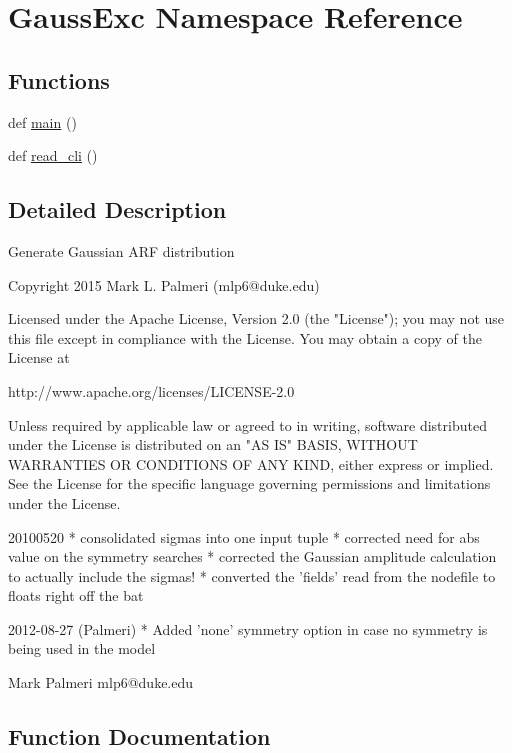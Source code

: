 \hypertarget{namespaceGaussExc}{}\section{Gauss\+Exc Namespace Reference}
\label{namespaceGaussExc}
\subsection*{Functions}
\begin{DoxyCompactItemize}
\item 
def \hyperlink{namespaceGaussExc_a0fa3008da0986251f5056832760afdc1}{main} ()
\item 
def \hyperlink{namespaceGaussExc_a405fba797ba4904016b95c6cf987bf55}{read\+\_\+cli} ()
\end{DoxyCompactItemize}


\subsection{Detailed Description}
\begin{DoxyVerb}Generate Gaussian ARF distribution

Copyright 2015 Mark L. Palmeri (mlp6@duke.edu)

Licensed under the Apache License, Version 2.0 (the "License");
you may not use this file except in compliance with the License.
You may obtain a copy of the License at

http://www.apache.org/licenses/LICENSE-2.0

Unless required by applicable law or agreed to in writing, software
distributed under the License is distributed on an "AS IS" BASIS,
WITHOUT WARRANTIES OR CONDITIONS OF ANY KIND, either express or implied.
See the License for the specific language governing permissions and
limitations under the License.

20100520
  * consolidated sigmas into one input tuple
  * corrected need for abs value on the symmetry searches
  * corrected the Gaussian amplitude calculation to actually include the sigmas!
  * converted the 'fields' read from the nodefile to floats right off the bat

2012-08-27 (Palmeri)
  * Added 'none' symmetry option in case no symmetry is being used in the model

Mark Palmeri
mlp6@duke.edu
\end{DoxyVerb}
 

\subsection{Function Documentation}
\hypertarget{namespaceGaussExc_a0fa3008da0986251f5056832760afdc1}{}
